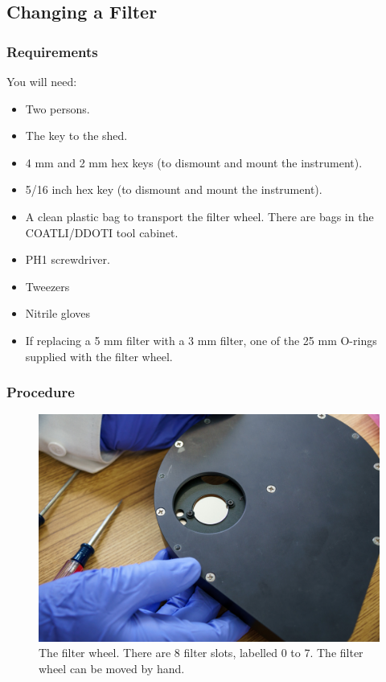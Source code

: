 \subsection{Changing a Filter}

\subsubsection{Requirements}

You will need:

\begin{itemize}
    \item Two persons.
    \item The key to the shed.
    \item 4 mm and 2 mm hex keys (to dismount and mount the instrument).
    \item 5/16 inch hex key (to dismount and mount the instrument).
    \item A clean plastic bag to transport the filter wheel. There are bags in the COATLI/DDOTI tool cabinet.
    \item PH1 screwdriver.
    \item Tweezers
    \item Nitrile gloves
    \item If replacing a 5 mm filter with a 3 mm filter, one of the 25 mm O-rings supplied with the filter wheel.
\end{itemize}

\subsubsection{Procedure}

\begin{figure}
\begin{center}
\includegraphics[width=0.8\linewidth]{figures/huitzi-f8-filter-wheel-slots.jpg}
\end{center}
\caption{The filter wheel. There are 8 filter slots, labelled 0 to 7. The filter wheel can be moved by hand.}
\label{figure:huitzi-f8-filter-wheel-slots}
\end{figure}

